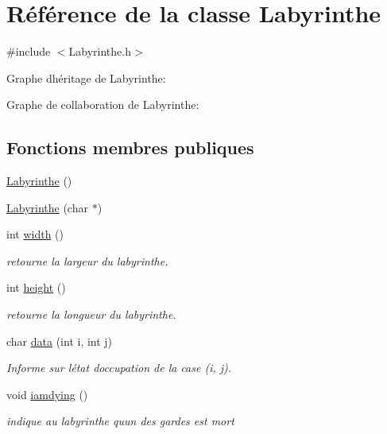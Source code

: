 \hypertarget{classLabyrinthe}{}\section{Référence de la classe Labyrinthe}
\label{classLabyrinthe}


{\ttfamily \#include $<$Labyrinthe.\+h$>$}



Graphe d\textquotesingle{}héritage de Labyrinthe\+:


Graphe de collaboration de Labyrinthe\+:
\subsection*{Fonctions membres publiques}
\begin{DoxyCompactItemize}
\item 
\hyperlink{classLabyrinthe_a46d8e42b8f59bf7e24ac7a967ac30e6e}{Labyrinthe} ()
\item 
\hyperlink{classLabyrinthe_a16aa4865644d59a8ed9fde15cd5e7275}{Labyrinthe} (char $\ast$)
\item 
int \hyperlink{classLabyrinthe_a55373ffb068b7f84c24108ce0f7d111c}{width} ()
\begin{DoxyCompactList}\small\item\em retourne la largeur du labyrinthe. \end{DoxyCompactList}\item 
int \hyperlink{classLabyrinthe_a71d545c9606ad5e8bf840293f22e552b}{height} ()
\begin{DoxyCompactList}\small\item\em retourne la longueur du labyrinthe. \end{DoxyCompactList}\item 
char \hyperlink{classLabyrinthe_a433936ae60ddf3f0b85a407f414b8d38}{data} (int i, int j)
\begin{DoxyCompactList}\small\item\em Informe sur l\textquotesingle{}état d\textquotesingle{}occupation de la case (i, j). \end{DoxyCompactList}\item 
void \hyperlink{classLabyrinthe_a987dc5663797cae6f75853e24a9f3ffb}{iamdying} ()
\begin{DoxyCompactList}\small\item\em indique au labyrinthe qu\textquotesingle{}un des gardes est mort \end{DoxyCompactList}\item 

\end{DoxyCompactItemize}
